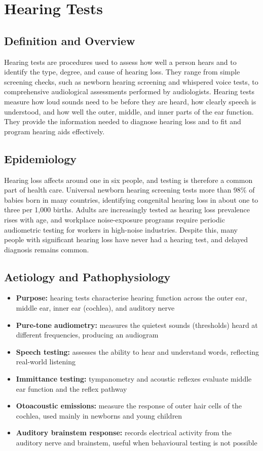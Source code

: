 \chapter{Hearing Tests}

\section*{Definition and Overview}
Hearing tests are procedures used to assess how well a person hears and to identify the type, degree, and cause of hearing loss. They range from simple screening checks, such as newborn hearing screening and whispered voice tests, to comprehensive audiological assessments performed by audiologists. Hearing tests measure how loud sounds need to be before they are heard, how clearly speech is understood, and how well the outer, middle, and inner parts of the ear function. They provide the information needed to diagnose hearing loss and to fit and program hearing aids effectively.

\section*{Epidemiology}
Hearing loss affects around one in six people, and testing is therefore a common part of health care. Universal newborn hearing screening tests more than 98\% of babies born in many countries, identifying congenital hearing loss in about one to three per 1,000 births. Adults are increasingly tested as hearing loss prevalence rises with age, and workplace noise-exposure programs require periodic audiometric testing for workers in high-noise industries. Despite this, many people with significant hearing loss have never had a hearing test, and delayed diagnosis remains common.

\section*{Aetiology and Pathophysiology}
\begin{itemize}
    \item \textbf{Purpose:} hearing tests characterise hearing function across the outer ear, middle ear, inner ear (cochlea), and auditory nerve
    \item \textbf{Pure-tone audiometry:} measures the quietest sounds (thresholds) heard at different frequencies, producing an audiogram
    \item \textbf{Speech testing:} assesses the ability to hear and understand words, reflecting real-world listening
    \item \textbf{Immittance testing:} tympanometry and acoustic reflexes evaluate middle ear function and the reflex pathway
    \item \textbf{Otoacoustic emissions:} measure the response of outer hair cells of the cochlea, used mainly in newborns and young children
    \item \textbf{Auditory brainstem response:} records electrical activity from the auditory nerve and brainstem, useful when behavioural testing is not possible
\end{itemize}

